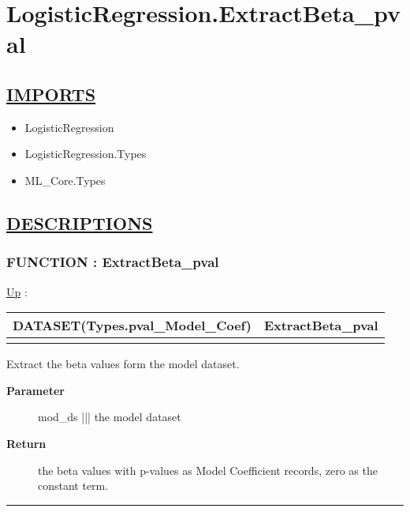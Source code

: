 \chapter*{LogisticRegression.ExtractBeta\_pval}
\hypertarget{ecldoc:toc:LogisticRegression.ExtractBeta_pval}{}

\section*{\underline{IMPORTS}}
\begin{itemize}
\item LogisticRegression
\item LogisticRegression.Types
\item ML\_Core.Types
\end{itemize}

\section*{\underline{DESCRIPTIONS}}
\subsection*{FUNCTION : ExtractBeta\_pval}
\hypertarget{ecldoc:logisticregression.extractbeta_pval}{}
\hyperlink{ecldoc:toc:LogisticRegression}{Up} :

{\renewcommand{\arraystretch}{1.5}
\begin{tabularx}{\textwidth}{|>{\raggedright\arraybackslash}l|X|}
\hline
\hspace{0pt}DATASET(Types.pval\_Model\_Coef) & ExtractBeta\_pval \\
\hline
\multicolumn{2}{|>{\raggedright\arraybackslash}X|}{\hspace{0pt}(DATASET(Core\_Types.Layout\_Model) mod\_ds)} \\
\hline
\end{tabularx}
}

\par
Extract the beta values form the model dataset.

\par
\begin{description}
\item [\textbf{Parameter}] mod\_ds ||| the model dataset
\item [\textbf{Return}] the beta values with p-values as Model Coefficient records, zero as the constant term.
\end{description}

\rule{\linewidth}{0.5pt}
